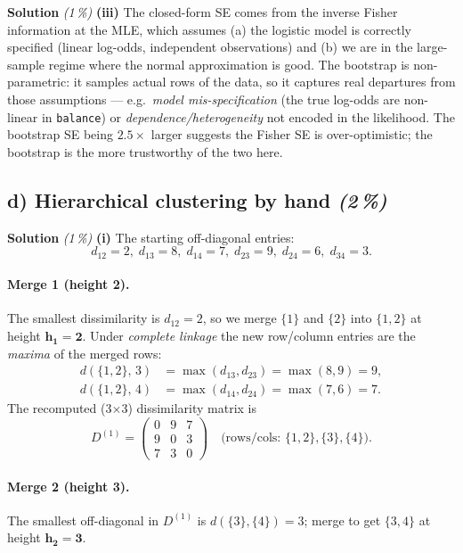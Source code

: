 \documentclass[11pt,a4paper]{article}
\newcommand{\subpoints}[1]{\textit{(#1\,\%)}}
\newcommand{\sol}{\noindent\textbf{Solution}}
\begin{document}
\medskip
\sol{} \subpoints{1} \textbf{(iii)} The closed-form SE comes from the inverse Fisher information at
the MLE, which assumes (a) the logistic model is correctly specified (linear log-odds, independent
observations) and (b) we are in the large-sample regime where the normal approximation is good.
The bootstrap is non-parametric: it samples actual rows of the data, so it captures real
departures from those assumptions --- e.g.\ \emph{model mis-specification} (the true log-odds are
non-linear in \texttt{balance}) or \emph{dependence/heterogeneity} not encoded in the likelihood.
The bootstrap SE being $2.5\times$ larger suggests the Fisher SE is over-optimistic; the
bootstrap is the more trustworthy of the two here.

\subsection*{d) Hierarchical clustering by hand \subpoints{2}}

\sol{} \subpoints{1} \textbf{(i)} The starting off-diagonal entries:
$$d_{12}=2,\;d_{13}=8,\;d_{14}=7,\;d_{23}=9,\;d_{24}=6,\;d_{34}=3.$$

\paragraph{Merge 1 (height 2).} The smallest dissimilarity is $d_{12}=2$, so we merge $\{1\}$ and
$\{2\}$ into $\{1,2\}$ at height $\mathbf{h_1 = 2}$. Under \emph{complete linkage} the new
row/column entries are the \emph{maxima} of the merged rows:
\begin{align*}
d(\{1,2\},\,3) &= \max(d_{13},d_{23}) = \max(8,9) = 9, \\
d(\{1,2\},\,4) &= \max(d_{14},d_{24}) = \max(7,6) = 7.
\end{align*}
The recomputed (3$\times$3) dissimilarity matrix is
$$D^{(1)} = \begin{pmatrix}
0 & 9 & 7 \\
9 & 0 & 3 \\
7 & 3 & 0
\end{pmatrix}
\quad\text{(rows/cols: $\{1,2\},\{3\},\{4\}$).}$$

\paragraph{Merge 2 (height 3).} The smallest off-diagonal in $D^{(1)}$ is $d(\{3\},\{4\}) = 3$;
merge to get $\{3,4\}$ at height $\mathbf{h_2 = 3}$.
\end{document}
